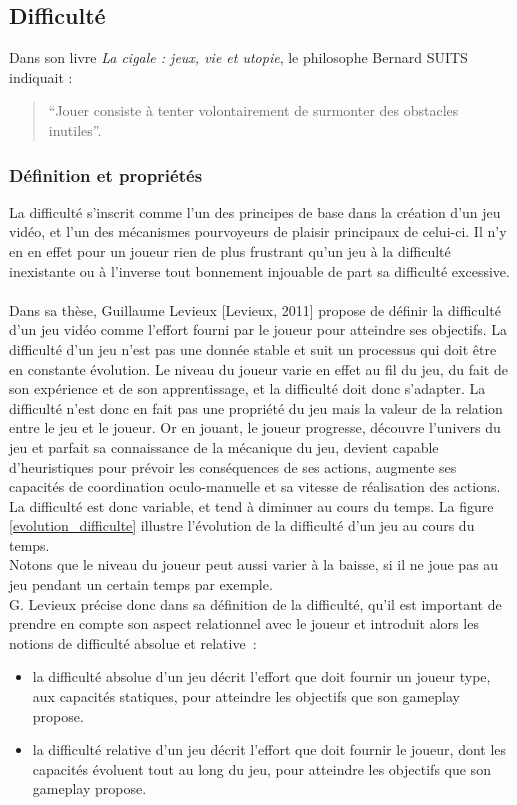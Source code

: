 \subsection{Difficulté}
Dans son livre \emph{La cigale : jeux, vie et utopie}, le philosophe Bernard SUITS indiquait : \begin{quote}{“Jouer consiste à tenter volontairement de surmonter des obstacles inutiles”}.  \end{quote}
		
	\subsubsection{Définition et propriétés}
La difficulté s’inscrit comme l’un des principes de base dans la création d’un jeu vidéo, et l’un des mécanismes pourvoyeurs de plaisir principaux de celui-ci. Il n’y en en effet pour un joueur rien de plus frustrant qu’un jeu à la difficulté inexistante ou à l’inverse tout bonnement injouable de part sa difficulté excessive. \paragraph{}

Dans sa thèse, Guillaume Levieux [Levieux, 2011]\cite{Levi11} propose de définir la difficulté d’un jeu vidéo comme l’effort fourni par le joueur pour atteindre ses objectifs. La difficulté d’un jeu n’est pas une donnée stable et suit un processus qui doit être en constante évolution. Le niveau du joueur varie en effet au fil du jeu, du fait de son expérience et de son apprentissage, et la difficulté doit donc s’adapter. 
La difficulté n’est donc en fait pas une propriété du jeu mais la valeur de la relation entre le jeu et le joueur. Or en jouant, le joueur progresse, découvre l’univers du jeu et parfait sa connaissance de la mécanique du jeu, devient capable d’heuristiques pour prévoir les conséquences de ses actions, augmente ses capacités de coordination oculo-manuelle et sa vitesse de réalisation des actions. La difficulté est donc variable, et tend à diminuer au cours du temps. La figure \ref{evolution_difficulte} illustre l'évolution de la difficulté d'un jeu au cours du temps.\\
Notons que le niveau du joueur peut aussi varier à la baisse, si il ne joue pas au jeu pendant un certain temps par exemple. \\

G. Levieux précise donc dans sa définition de la difficulté, qu’il est important de prendre en compte son aspect relationnel avec le joueur et introduit alors les notions de difficulté absolue et relative~:
	\begin{itemize}
		\item la difficulté absolue d’un jeu décrit l’effort que doit fournir un joueur type, aux capacités statiques, pour atteindre les objectifs que son gameplay propose. 
		\item la difficulté relative d’un jeu décrit l’effort que doit fournir le joueur, dont les capacités évoluent tout au long du jeu, pour atteindre les objectifs que son gameplay propose.
	\end{itemize}
